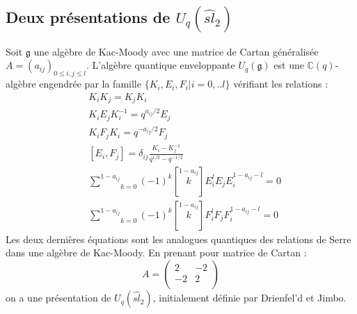 \documentclass[12pt]{article}
\theoremstyle{definition}
\begin{document}
\subsection{Deux présentations de $U_q(\widehat{sl}_{2})$}
Soit $\mathfrak{g}$ une algèbre de Kac-Moody avec une matrice de Cartan généralisée $A=(a_{ij})_{0\leqslant i,j\leqslant l}$. L'algèbre quantique enveloppante $U_q(\mathfrak{g})$ est une $\mathbb{C}(q)$-algèbre engendrée par la famille $\{K_i,E_i,F_i\vert i=0,..l\}$ vérifiant les relations :
\begin{align}
&K_iK_j=K_jK_i\\
&K_iE_jK_i^{-1}=q^{a_{ij}/2}E_j\\
&K_iF_jK_i=q^{-a_{ij}/2}F_j\\
&[E_i,F_j]=\delta_{ij}\frac{K_i-K_j^{-1}}{q^{1/2}-q^{-1/2}}\\
&\underset{k=0}{\overset{1-a_{ij}}\sum}(-1)^{k}\left[\overset{1-a_{ij}}{k}\right] E_i^lE_jE_i^{1-a_{ij}-l}=0\\
&\underset{k=0}{\overset{1-a_{ij}}\sum}(-1)^{k}\left[\overset{1-a_{ij}}{k}\right] F_i^lF_jF_i^{1-a_{ij}-l}=0
\end{align}
Les deux dernières équations sont les analogues quantiques des relations de Serre dans une algèbre de Kac-Moody. En prenant pour matrice de Cartan : $$A=\begin{pmatrix}
2 & -2 \\
-2 & 2 \\
\end{pmatrix}$$ on a une présentation de  $U_q(\widehat{sl}_{2})$, initialement définie par Drienfel'd et Jimbo.\vspace{0.5cm}
\end{document}

